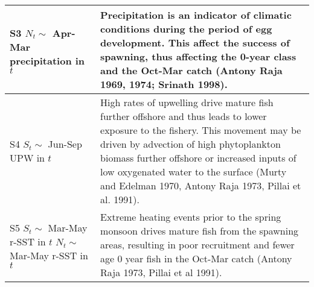\begin{table}
\begin{tabular}[t]{>{\raggedright\arraybackslash}p{5.5cm}|>{\raggedright\arraybackslash}p{10cm}}
\hline
S3 \newline $N_t \sim$ Apr-Mar precipitation in $t$ & Precipitation is an indicator of climatic conditions during the period of egg development. This affect the success of spawning, thus affecting the 0-year class and the Oct-Mar catch (Antony Raja 1969, 1974; Srinath 1998).\\
\hline
S4 \newline $S_t \sim$ Jun-Sep UPW in $t$ & High rates of upwelling drive mature fish further offshore and thus leads to lower exposure to the fishery.  This movement may be driven by advection of high phytoplankton biomass further offshore or increased inputs of low oxygenated water to the surface (Murty and Edelman 1970, Antony Raja 1973, Pillai et al. 1991).\\
\hline
S5 \newline $S_t \sim$ Mar-May r-SST in $t$ \newline $N_t \sim$ Mar-May r-SST in $t$ & Extreme heating events prior to the spring monsoon drives mature fish from the spawning areas, resulting in poor recruitment and fewer age 0 year fish in the Oct-Mar catch (Antony Raja 1973, Pillai et al 1991).\\
\hline
\end{tabular}
\end{table}

